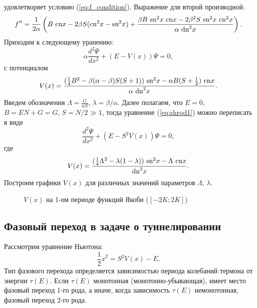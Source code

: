 \documentclass[12pt]{article}
\begin{document}
%
удовлетворяет условию (\ref{eq:f_condition}).
Выражение для второй производной:
%
$$f'' = \frac{1}{2 \alpha} \left( B~\textrm{cn} x - 2\beta S (\textrm{cn}^2 x - \textrm{sn}^2 x) + \frac{\beta B~\textrm{sn}^2 x~\textrm{cn} x - 2 \beta^2 S~\textrm{sn}^2 x~\textrm{cn}^2 x}{\alpha~\textrm{dn}^2 x} \right).$$
%
Приходим к следующему уранению:
%
\begin{equation}
\alpha \frac{d^2 \Psi}{dx^2} + (E - V(x)) \Psi = 0,
\label{eq:shrod1}
\end{equation}
%
с потенциалом
%
\begin{equation}
V(x) = \frac{(\frac{1}{4}B^2 - \beta(\alpha - \beta) S (S+1))~\textrm{sn}^2 x - \alpha B (S + \frac{1}{2})~\textrm{cn} x}{\alpha~\textrm{dn}^2 x}.
\end{equation}
%
Введем обозначения $\Lambda = \frac{G}{\alpha S}$, $\lambda = \beta / \alpha$.
Далее полагаем, что $E = 0$, $B = EN + G = G$, $S = N/2 \gg 1$, тогда уравнение (\ref{eq:shrod1}) можно переписать в виде
%
\begin{equation}
\frac{d^2 \Psi}{dx^2} + (E - S^2 V(x)) \Psi = 0,
\label{eq:shrod2}
\end{equation}
% 
где
%
\begin{equation}
V(x) = \frac{(\frac{1}{4} \Lambda^2 - \lambda (1 - \lambda))~\textrm{sn}^2 x - \Lambda~\textrm{cn} x}{\textrm{dn}^2 x}.
\end{equation}
%
%
%
Построим графики $V(x)$ для различных значений параметров $\Lambda$, $\lambda$.
%
\begin{figure}[Ht!]
\caption{$V(x)$ на 1-ом периоде функций Якоби ($[-2K; 2K]$)}
\end{figure}
%
%

\subsection*{Фазовый переход в задаче о туннелировании}

Рассмотрим уравнение Ньютона:
%
\begin{equation}
\frac{1}{2} \dot{x}^2 = S^2 V(x) - E.
\label{eq:newton}
\end{equation}
%
Тип фазового перехода определяется зависимостью периода колебаний термона от энергии $\tau(E)$.
Если $\tau(E)$ монотонная (монотонно-убывающая), имеет место фазовый переход 1-го рода, а иначе, когда зависимость $\tau(E)$ немонотонная, фазовый переход 2-го рода.
\end{document}
